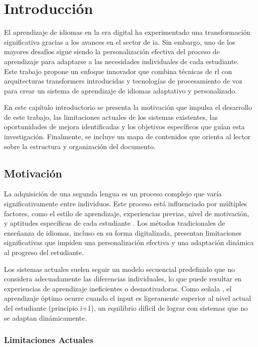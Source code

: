 \chapter{Introducción}
\label{chap:introduccion}

El aprendizaje de idiomas en la era digital ha experimentado una transformación significativa gracias a los avances en el sector de \gls{ia}. Sin embargo, uno de los mayores desafíos sigue siendo la personalización efectiva del proceso de aprendizaje para adaptarse a las necesidades individuales de cada estudiante. Este trabajo propone un enfoque innovador que combina técnicas de \gls{rl} con arquitecturas \gls{transformers} introducidas y tecnologías de procesamiento de voz para crear un sistema de aprendizaje de idiomas adaptativo y personalizado.

En este capítulo introductorio se presenta la motivación que impulsa el desarrollo de este trabajo, las limitaciones actuales de los sistemas existentes, las oportunidades de mejora identificadas y los objetivos específicos que guían esta investigación. Finalmente, se incluye un mapa de contenidos que orienta al lector sobre la estructura y organización del documento.

\section{Motivación}
\label{sec:motivacion}

La adquisición de una segunda lengua es un proceso complejo que varía significativamente entre individuos. Este proceso está influenciado por múltiples factores, como el estilo de aprendizaje, experiencias previas, nivel de motivación, y aptitudes específicas de cada estudiante \cite{ellis1994study}. Los métodos tradicionales de enseñanza de idiomas, incluso en su forma digitalizada, presentan limitaciones significativas que impiden una personalización efectiva y una adaptación dinámica al progreso del estudiante.

Los sistemas actuales suelen seguir un modelo secuencial predefinido que no considera adecuadamente las diferencias individuales, lo que puede resultar en experiencias de aprendizaje ineficientes o desmotivadoras. Como señala \cite{krashen1982principles}, el aprendizaje óptimo ocurre cuando el input es ligeramente superior al nivel actual del estudiante (principio i+1), un equilibrio difícil de lograr con sistemas que no se adaptan dinámicamente.

\subsection{Limitaciones Actuales}
\label{subsec:limitaciones-actuales}

